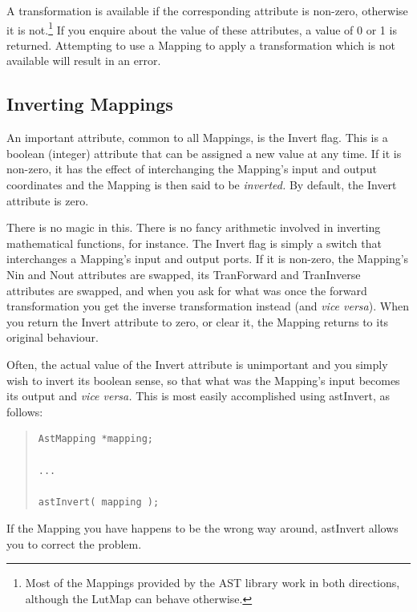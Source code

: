 \documentclass[twoside,11pt]{article}
\newcommand{\htmlref}[2]{#1}
\begin{document}
A transformation is available if the corresponding attribute is
non-zero, otherwise it is not.\footnote{Most of the Mappings provided
by the AST library work in both directions, although the \htmlref{LutMap}{LutMap} can
behave otherwise.} If you enquire about the value of these attributes,
a value of 0 or 1 is returned.  Attempting to use a Mapping to apply a
transformation which is not available will result in an error.

\subsection{\label{ss:invertingmappings}Inverting Mappings}

An important attribute, common to all Mappings, is the \htmlref{Invert}{Invert}
flag. This is a boolean (integer) attribute that can be assigned a new
value at any time. If it is non-zero, it has the effect of
interchanging the \htmlref{Mapping}{Mapping}'s input and output coordinates and the
Mapping is then said to be {\em{inverted.}} By default, the Invert
attribute is zero.

There is no magic in this. There is no fancy arithmetic involved in
inverting mathematical functions, for instance. The Invert flag is
simply a switch that interchanges a Mapping's input and output
ports. If it is non-zero, the Mapping's \htmlref{Nin}{Nin} and \htmlref{Nout}{Nout} attributes are
swapped, its \htmlref{TranForward}{TranForward} and \htmlref{TranInverse}{TranInverse} attributes are swapped, and
when you ask for what was once the forward transformation you get the
inverse transformation instead (and {\em{vice versa}}). When you
return the Invert attribute to zero, or clear it, the Mapping returns
to its original behaviour.

Often, the actual value of the Invert attribute is unimportant and you
simply wish to invert its boolean sense, so that what was the
Mapping's input becomes its output and {\em{vice versa.}} This is most
easily accomplished using \htmlref{astInvert}{astInvert}, as follows:

\begin{quote}
\small
\begin{verbatim}
AstMapping *mapping;

...

astInvert( mapping );
\end{verbatim}
\normalsize
\end{quote}

If the Mapping you have happens to be the wrong way around, astInvert
allows you to correct the problem.
\end{document}
